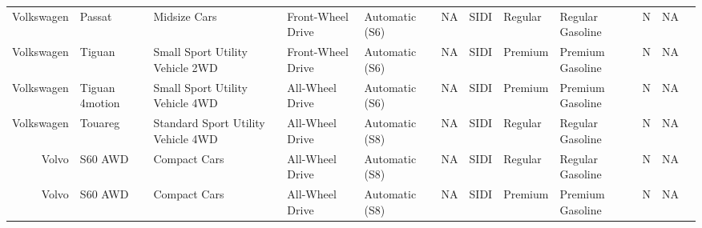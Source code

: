 \documentclass[11pt]{article}
\begin{document}
\begin{tabular}{r|lllllllllll}
	 Volkswagen                         & Passat                             & Midsize Cars                       & Front-Wheel Drive                  & Automatic (S6)                     & NA                                 & SIDI                               & Regular                            & Regular Gasoline                   & N                                  & NA                                \\
	 Volkswagen                         & Tiguan                             & Small Sport Utility Vehicle 2WD    & Front-Wheel Drive                  & Automatic (S6)                     & NA                                 & SIDI                               & Premium                            & Premium Gasoline                   & N                                  & NA                                \\
	 Volkswagen                         & Tiguan 4motion                     & Small Sport Utility Vehicle 4WD    & All-Wheel Drive                    & Automatic (S6)                     & NA                                 & SIDI                               & Premium                            & Premium Gasoline                   & N                                  & NA                                \\
	 Volkswagen                         & Touareg                            & Standard Sport Utility Vehicle 4WD & All-Wheel Drive                    & Automatic (S8)                     & NA                                 & SIDI                               & Regular                            & Regular Gasoline                   & N                                  & NA                                \\
	 Volvo                              & S60 AWD                            & Compact Cars                       & All-Wheel Drive                    & Automatic (S8)                     & NA                                 & SIDI                               & Regular                            & Regular Gasoline                   & N                                  & NA                                \\
	 Volvo                              & S60 AWD                            & Compact Cars                       & All-Wheel Drive                    & Automatic (S8)                     & NA                                 & SIDI                               & Premium                            & Premium Gasoline                   & N                                  & NA                                \\

\end{tabular}
\end{document}
